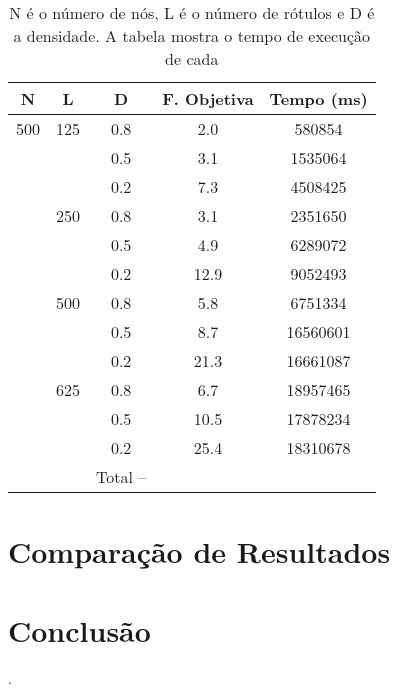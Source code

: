 \documentclass{sig-alternate-05-2015}
\begin{document}
\begin{table}[!h]
	\begin{tabular}{ccccc}
		\hline \rule[-2ex]{0pt}{5.5ex} N & L & D  & F. Objetiva & Tempo (ms) \\ 
		\hline \rule[-2ex]{0pt}{5.5ex} 500 & 125 & 0.8 & 2.0 & 580854 \\ 
		\hline \rule[-2ex]{0pt}{5.5ex}  &  & 0.5 & 3.1 & 1535064 \\ 
		\hline \rule[-2ex]{0pt}{5.5ex}  &  & 0.2 & 7.3 & 4508425 \\ 
		\hline \rule[-2ex]{0pt}{5.5ex}  & 250 & 0.8 & 3.1 & 2351650 \\ 
		\hline \rule[-2ex]{0pt}{5.5ex}  &  & 0.5 & 4.9 & 6289072 \\ 
		\hline \rule[-2ex]{0pt}{5.5ex}  &  & 0.2 & 12.9 & 9052493 \\ 
		\hline \rule[-2ex]{0pt}{5.5ex}  & 500 & 0.8 & 5.8 & 6751334 \\ 
		\hline \rule[-2ex]{0pt}{5.5ex}  &  & 0.5 & 8.7 & 16560601 \\ 
		\hline \rule[-2ex]{0pt}{5.5ex}  &  & 0.2 & 21.3 & 16661087 \\ 
		\hline \rule[-2ex]{0pt}{5.5ex}  & 625 & 0.8 & 6.7 & 18957465 \\ 
		\hline \rule[-2ex]{0pt}{5.5ex}  &  & 0.5 & 10.5 & 17878234 \\ 
		\hline \rule[-2ex]{0pt}{5.5ex}  &  & 0.2 & 25.4 & 18310678 \\ 
		\hline \rule[-2ex]{0pt}{5.5ex}  &  & Total -- &  &  \\ 
		\hline 
	\end{tabular}  
	\caption{N é o número de nós, L é o número de rótulos e D é a densidade.  A tabela mostra o tempo de execução de cada}
	\label{tab4}
\end{table}
\section{Comparação de Resultados} \label{sec5}

\section{Conclusão} \label{sec6}

.

%

%
%
\appendix
\end{document}
